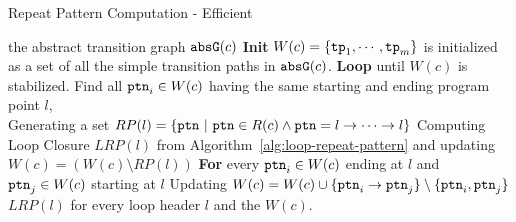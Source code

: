 \begin{algorithm}
\caption{
{Repeat Pattern Computation - Efficient}
\label{alg:repeat-pattern}
}
\begin{algorithmic}[1]
\REQUIRE the abstract transition graph $\mathtt{abs}{\mathtt{G}}(c)$
\STATE  \textbf{Init} $W(c) = \{\mathtt{tp}_1, \cdots, \mathtt{tp}_m\}$ is initialized as a set of all the simple transition paths in $\mathtt{abs}{\mathtt{G}}(c)$.
\STATE  \textbf{Loop} until $W(c)$ is stabilized.
\STATE    \quad Find all $\mathtt{ptn}_i \in W(c)$ having the same starting and ending program point $l$,
      \\  \quad \quad Generating a set $RP(l) = \{\mathtt{ptn} ~|~ \mathtt{ptn} \in R(c) \land \mathtt{ptn} = l \to \cdots \to l\}$
\STATE    \quad \quad Computing Loop Closure $LRP(l)$ from Algorithm~\ref{alg:loop-repeat-pattern} and updating $W(c) = (W(c) \setminus RP(l))$
\STATE  \quad \quad  \textbf{For}  every  $\mathtt{ptn}_i \in W(c)$ ending at $l$ and $\mathtt{ptn}_j \in W(c)$ starting at $l$
\STATE  \quad \quad \quad Updating $W(c) = W(c)  \cup \{\mathtt{ptn}_i \to \mathtt{ptn}_j\} \setminus \{\mathtt{ptn}_i, \mathtt{ptn}_j\}$ 
\RETURN $LRP(l)$ for every loop header $l$ and the $W(c)$.
\end{algorithmic}
\end{algorithm}
%
